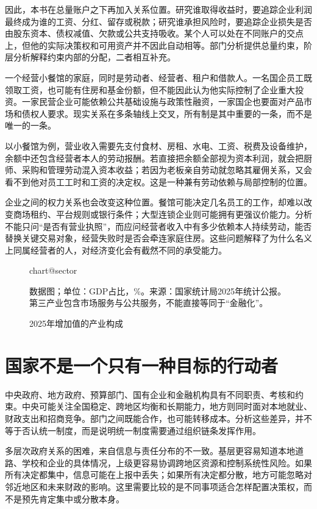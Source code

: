 \documentclass[UTF8,fontset=fandol,zihao=-4,oneside,openany]{ctexbook}
\makeatletter
\newcommand{\Chart}[3]{\begin{figure}[htbp]\centering\csname chart@#1\endcsname\caption{#2}\par\small #3\end{figure}}
\makeatother
\begin{document}
因此，本书在总量账户之下再加入关系位置。研究谁取得收益时，要追踪企业利润最终成为谁的工资、分红、留存或税款；研究谁承担风险时，要追踪企业损失是否由股东资本、债权减值、欠款或公共支持吸收。某个人可以处在不同账户的交点上，但他的实际决策权和可用资产并不因此自动相等。部门分析提供总量约束，阶层分析解释约束内部的分配，二者相互补充。

一个经营小餐馆的家庭，同时是劳动者、经营者、租户和借款人。一名国企员工既领取工资，也可能有住房和基金份额，但不能因此认为他实际控制了企业重大投资。一家民营企业可能依赖公共基础设施与政策性融资，一家国企也要面对产品市场和债权人要求。现实关系在多条轴线上交叉，所有制是其中重要的一条，而不是唯一的一条。

\label{arg:P020}
以小餐馆为例，营业收入需要先支付食材、房租、水电、工资、税费及设备维护，余额中还包含经营者本人的劳动报酬。若直接把余额全部视为资本利润，就会把厨师、采购和管理劳动混入资本收益；若因为老板亲自劳动就忽略其雇佣关系，又会看不到他对员工工时和工资的决定权。这是一种兼有劳动依赖与局部控制的位置。

企业之间的权力关系也会改变这种位置。餐馆可能决定几名员工的工作，却难以改变商场租约、平台规则或银行条件；大型连锁企业则可能拥有更强议价能力。分析不能只问“是否有营业执照”，而应问经营者收入中有多少依赖本人持续劳动，能否替换关键交易对象，经营失败时是否会牵连家庭住房。这些问题解释了为什么名义上同属经营者的人，对经济变化会有截然不同的承受能力。

\Chart{sector}{2025年增加值的产业构成}{数据图；单位：GDP占比，\%。来源：国家统计局2025年统计公报。第三产业包含市场服务与公共服务，不能直接等同于“金融化”。\cite{NBS2025}}

\section{国家不是一个只有一种目标的行动者}
中央政府、地方政府、预算部门、国有企业和金融机构具有不同职责、考核和约束。中央可能关注全国稳定、跨地区均衡和长期能力，地方则同时面对本地就业、财政支出和招商竞争。部门之间既能合作，也可能转移成本。分析这些差异，并不等于否认统一制度，而是说明统一制度需要通过组织链条发挥作用。

\label{arg:P021}
多层次政府关系的困难，来自信息与责任分布的不一致。基层更容易知道本地道路、学校和企业的具体情况，上级更容易协调跨地区资源和控制系统性风险。如果所有决定都集中，信息可能在上报中丢失；如果所有决定都分散，地方可能忽略对邻近地区和未来财政的影响。这里需要比较的是不同事项适合怎样配置决策权，而不是预先肯定集中或分散本身。
\end{document}
